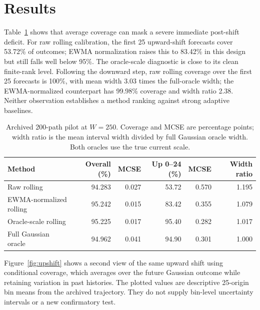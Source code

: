 \documentclass[11pt]{article}
\begin{document}
\section{Results}
Table~\ref{tab:pilot} shows that average coverage can mask a severe immediate
post-shift deficit. For raw rolling calibration, the first 25 upward-shift
forecasts cover 53.72\% of outcomes; EWMA normalization raises this to
83.42\% in this design but still falls well below 95\%. The oracle-scale
diagnostic is close to its clean finite-rank level. Following the downward
step, raw rolling coverage over the first 25 forecasts is 100\%, with mean
width 3.03 times the full-oracle width; the EWMA-normalized counterpart has
99.98\% coverage and width ratio 2.38. Neither observation establishes a
method ranking against strong adaptive baselines.

\begin{table}[H]
\centering
\small
\caption{Archived 200-path pilot at $W=250$. Coverage and MCSE are percentage
points; width ratio is the mean interval width divided by full Gaussian oracle
width. Both oracles use the true current scale.}
\label{tab:pilot}
\begin{tabular}{lrrrrr}
\toprule
Method & Overall (\%) & MCSE & Up 0--24 (\%) & MCSE & Width ratio \\
\midrule
Raw rolling & 94.283 & 0.027 & 53.72 & 0.570 & 1.195 \\
EWMA-normalized rolling & 95.242 & 0.015 & 83.42 & 0.355 & 1.079 \\
Oracle-scale rolling & 95.225 & 0.017 & 95.40 & 0.282 & 1.017 \\
Full Gaussian oracle & 94.962 & 0.041 & 94.90 & 0.301 & 1.000 \\
\bottomrule
\end{tabular}
\end{table}

Figure~\ref{fig:upshift} shows a second view of the same upward shift using
conditional coverage, which averages over the future Gaussian outcome while
retaining variation in past histories. The plotted values are descriptive
25-origin bin means from the archived trajectory. They do not supply
bin-level uncertainty intervals or a new confirmatory test.
\end{document}
